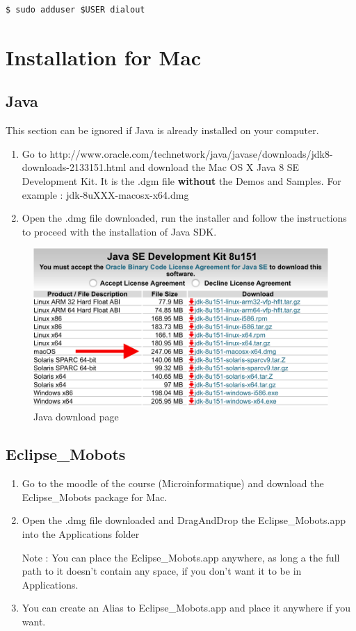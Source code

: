 \documentclass[a4paper]{article}
\begin{document}
\begin{lstlisting}
$ sudo adduser $USER dialout
\end{lstlisting}

\newpage
\section{Installation for Mac}

\subsection{Java}
This section can be ignored if Java is already installed on your computer.

\begin{enumerate}
\item Go to http://www.oracle.com/technetwork/java/javase/downloads/jdk8-downloads-2133151.html and download the Mac OS X Java 8 SE Development Kit. It is the .dgm file \textbf{without} the Demos and Samples.
For example : jdk-8uXXX-macosx-x64.dmg
\item Open the .dmg file downloaded, run the installer and follow the instructions to proceed with the installation of Java SDK.
\end{enumerate}

\begin{figure}[!h]
\centering
\includegraphics[width=0.7\columnwidth]{fig/Java_mac}
\caption{Java download page}
\label{fig:Java_mac}
\end{figure}

\subsection{Eclipse\_Mobots}

\begin{enumerate}
\item Go to the moodle of the course (Microinformatique) and download the Eclipse\_Mobots package for Mac.
\item Open the .dmg file downloaded and DragAndDrop the Eclipse\_Mobots.app into the Applications folder

Note : You can place the Eclipse\_Mobots.app anywhere, as long a the full path to it doesn't contain any space, if you don't want it to be in Applications.
\item You can create an Alias to Eclipse\_Mobots.app and place it anywhere if you want.
\end{enumerate}
\end{document}
